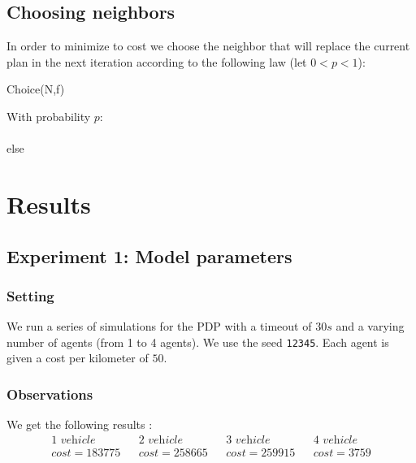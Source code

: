\documentclass[11pt]{article}
\begin{document}
\subsection{Choosing neighbors}
In order to minimize to cost we choose the neighbor that will replace the current plan in the next iteration according to the following law (let $0<p<1$):


\begin{algorithm}[H]
    \SetAlgoLined
    \caption{Choice(N,f)}
    With probability $p$:\\
    \\
    else\\
\end{algorithm}

\section{Results}

\subsection{Experiment 1: Model parameters}

\subsubsection{Setting}
We run a series of simulations for the PDP with a timeout of $30s$ and a varying number of agents (from 1 to 4 agents). We use the seed \texttt{12345}. Each agent is given a cost per kilometer of $50$.

\subsubsection{Observations}
We get the following results : 
\begin{align*} 
    \textit{1 vehicle} && \textit{2 vehicle} && \textit{3 vehicle} && \textit{4 vehicle} \\
   cost = 183775 && cost = 258665 && cost = 259915 && cost = 3759 
\end{align*}
\end{document}

